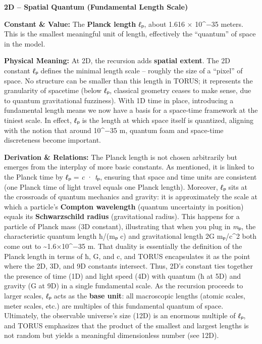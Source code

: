 \documentclass[
]{article}
\begin{document}
\textbf{2D -- Spatial Quantum (Fundamental Length Scale)}

\textbf{Constant \& Value:} The \textbf{Planck length} \emph{ℓ}ₚ, about
1.616 × 10\^{}−35 meters\hspace{0pt}. This is the smallest meaningful
unit of length, effectively the ``quantum'' of space in the model.

\textbf{Physical Meaning:} At 2D, the recursion adds \textbf{spatial
extent}. The 2D constant \emph{ℓ}ₚ defines the minimal length scale --
roughly the size of a ``pixel'' of space. No structure can be smaller
than this length in TORUS; it represents the granularity of spacetime
(below \emph{ℓ}ₚ, classical geometry ceases to make sense, due to
quantum gravitational fuzziness). With 1D time in place, introducing a
fundamental length means we now have a basis for a space-time framework
at the tiniest scale. In effect, \emph{ℓ}ₚ is the length at which space
itself is quantized, aligning with the notion that around 10\^{}−35 m,
quantum foam and space-time discreteness become important.

\textbf{Derivation \& Relations:} The Planck length is not chosen
arbitrarily but emerges from the interplay of more basic constants. As
mentioned, it is linked to the Planck time by \emph{ℓ}ₚ = \emph{c} ·
\emph{t}ₚ, ensuring that space and time units are consistent (one Planck
time of light travel equals one Planck length). Moreover, \emph{ℓ}ₚ sits
at the crossroads of quantum mechanics and gravity: it is approximately
the scale at which a particle's \textbf{Compton wavelength} (quantum
uncertainty in position) equals its \textbf{Schwarzschild radius}
(gravitational radius). This happens for a particle of Planck mass (3D
constant), illustrating that when you plug in \emph{m}ₚ, the
characteristic quantum length ħ/(mₚ c) and gravitational length 2G
mₚ/c\^{}2 both come out to \textasciitilde1.6×10\^{}−35 m\hspace{0pt}.
That duality is essentially the definition of the Planck length in terms
of ħ, G, and c, and TORUS encapsulates it as the point where the 2D, 3D,
and 9D constants intersect. Thus, 2D's constant ties together the
presence of time (1D) and light speed (4D) with quantum (ħ at 5D) and
gravity (G at 9D) in a single fundamental scale\hspace{0pt}. As the
recursion proceeds to larger scales, \emph{ℓ}ₚ acts as the \textbf{base
unit}: all macroscopic lengths (atomic scales, meter scales, etc.) are
multiples of this fundamental quantum of space. Ultimately, the
observable universe's size (12D) is an enormous multiple of \emph{ℓ}ₚ,
and TORUS emphasizes that the product of the smallest and largest
lengths is not random but yields a meaningful dimensionless number (see
12D)\hspace{0pt}.
\end{document}
